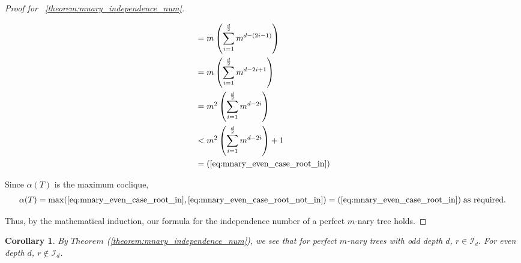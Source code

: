 \documentclass{amsart}
\newtheorem{corollary}[theorem]{Corollary}
\theoremstyle{definition}
\begin{document}
\begin{proof}[Proof for ~\ref{theorem:mnary_independence_num}]
\begin{caseof}
\begin{subcaseof}
			\begin{align*}
				& = m\left(\displaystyle\sum_{i = 1}^{\frac{d}{2}}m^{d - (2i - 1)}\right) \\
				& = m\left(\displaystyle\sum_{i = 1}^{\frac{d}{2}}m^{d - 2i + 1}\right) \\
				& = m^2\left(\displaystyle\sum_{i = 1}^{\frac{d}{2}}m^{d - 2i}\right) \\
				& < m^2\left(\displaystyle\sum_{i = 1}^{\frac{d}{2}}m^{d - 2i}\right) + 1 \\
				& = (\ref{eq:mnary_even_case_root_in})
			\end{align*}

		Since $\alpha(T)$ is the maximum coclique,
		\begin{align*}
			\alpha(T) = \max(\ref{eq:mnary_even_case_root_in}, \ref{eq:mnary_even_case_root_not_in}) = (\ref{eq:mnary_even_case_root_in})\; \text{as required.}
		\end{align*}
		\end{subcaseof}
	\end{caseof}

	Thus, by the mathematical induction, our formula for the independence number of a perfect $m$-nary tree holds.
\end{proof}

\begin{corollary}\label{cor:root_in_not_in}
	By $Theorem$ (\ref{theorem:mnary_independence_num}), we see that for perfect $m$-nary trees with odd depth $d$, $r \in \mathcal{I}_d$. For even depth $d$, $r \not\in \mathcal{I}_d$.
\end{corollary}
\end{document}
